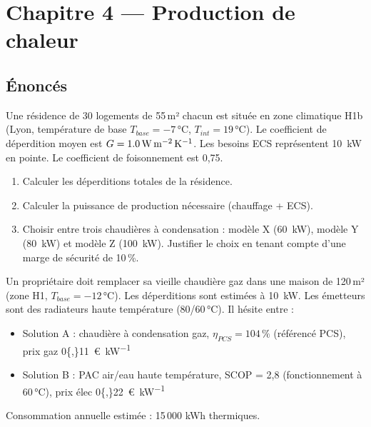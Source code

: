 \chapter*{Chapitre 4 — Production de chaleur}

\section*{Énoncés}


Une résidence de 30 logements de 55\,m² chacun est située en zone climatique H1b (Lyon, température de base $T_{base} = -7$\,°C, $T_{int} = 19$\,°C). Le coefficient de déperdition moyen est $G = \SI{1{,}0}{\watt\per\square\metre\per\kelvin}$. Les besoins ECS représentent \SI{10}{\kilo\watt} en pointe. Le coefficient de foisonnement est 0,75.

\begin{enumerate}
  \item Calculer les déperditions totales de la résidence.
  \item Calculer la puissance de production nécessaire (chauffage + ECS).
  \item Choisir entre trois chaudières à condensation : modèle X (\SI{60}{\kilo\watt}), modèle Y (\SI{80}{\kilo\watt}) et modèle Z (\SI{100}{\kilo\watt}). Justifier le choix en tenant compte d'une marge de sécurité de 10\,\%.
\end{enumerate}



Un propriétaire doit remplacer sa vieille chaudière gaz dans une maison de 120\,m² (zone H1, $T_{base} = -12$\,°C). Les déperditions sont estimées à \SI{10}{\kilo\watt}. Les émetteurs sont des radiateurs haute température (80/60\,°C). Il hésite entre :
\begin{itemize}
  \item Solution A : chaudière à condensation gaz, $\eta_{PCS} = 104\,\%$ (référencé PCS), prix gaz \SI{0{,}11}{\euro\per\kilo\watt\heure}
  \item Solution B : PAC air/eau haute température, SCOP = 2,8 (fonctionnement à 60\,°C), prix élec \SI{0{,}22}{\euro\per\kilo\watt\heure}
\end{itemize}
Consommation annuelle estimée : 15\,000 kWh thermiques.

